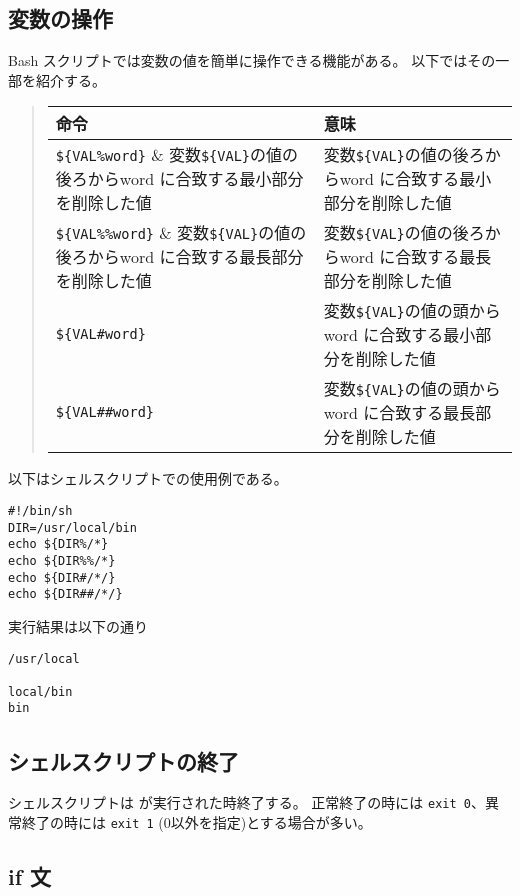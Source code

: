 \documentclass{jreport}
\begin{document}
\subsection{変数の操作}

Bash スクリプトでは変数の値を簡単に操作できる機能がある。
以下ではその一部を紹介する。

\index{\$\{\%\}}
\index{\$\{\%\%\}}
\index{\$\{\#\}}
\index{\$\{\#\#\}}
\begin{quote}
\begin{tabular}[t]{lp{10cm}} \hline
命令 & 意味 \\ \hline
\verb|${VAL%word}| & 変数\verb|${VAL}|の値の後ろからword に合致する最小部分を削除した値\\
\verb|${VAL%%word}| & 変数\verb|${VAL}|の値の後ろからword に合致する最長部分を削除した値\\
\verb|${VAL#word}| & 変数\verb|${VAL}|の値の頭からword に合致する最小部分を削除した値\\
\verb|${VAL##word}| & 変数\verb|${VAL}|の値の頭からword に合致する最長部分を削除した値\\
\hline
\end{tabular}
\end{quote}

以下はシェルスクリプトでの使用例である。
\begin{screen}
\begin{verbatim}
#!/bin/sh
DIR=/usr/local/bin
echo ${DIR%/*}
echo ${DIR%%/*}
echo ${DIR#/*/}
echo ${DIR##/*/}
\end{verbatim}
\end{screen}
実行結果は以下の通り
\begin{screen}
\begin{verbatim}
/usr/local

local/bin
bin
\end{verbatim}
\end{screen}


\subsection{シェルスクリプトの終了}

シェルスクリプトは 
が実行された時終了する。
正常終了の時には \verb|exit 0|、異常終了の時には 
\verb|exit 1| (0以外を指定)とする場合が多い。

\subsection{if 文}
\end{document}
